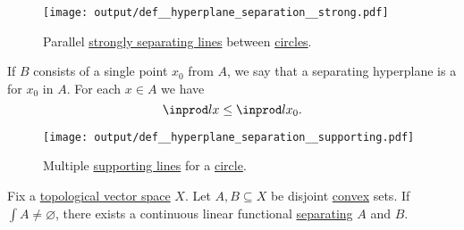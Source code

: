 \begin{definition}
\begin{thmenum}
    \begin{figure}[!ht]
      \centering
      \texttt{[image: output/def\_\_hyperplane\_separation\_\_strong.pdf]}
      \caption{Parallel \hyperref[def:hyperplane_separation/strong]{strongly separating lines} between \hyperref[def:circle]{circles}.}\label{fig:def:hyperplane_separation/strong}
    \end{figure}

     If \( B \) consists of a single point \( x_0 \) from \( A \), we say that a separating hyperplane is a  for \( x_0 \) in \( A \). For each \( x \in A \) we have
    \begin{equation}\label{eq:def:hyperplane_separation/supporting}
      \inprod l x \leq \inprod l {x_0}.
    \end{equation}

    \begin{figure}[!ht]
      \centering
      \texttt{[image: output/def\_\_hyperplane\_separation\_\_supporting.pdf]}
      \caption{Multiple \hyperref[def:hyperplane_separation/supporting]{supporting lines} for a \hyperref[def:circle]{circle}.}\label{fig:def:hyperplane_separation/supporting}
    \end{figure}
  \end{thmenum}
\end{definition}

\begin{theorem}\label{thm:hahn_banach_hyperplane_separation}
  Fix a \hyperref[def:topological_vector_space]{topological vector space} \( X \). Let \( A, B \subseteq X \) be disjoint \hyperref[def:convex_hull]{convex} sets. If \( \int{A} \neq \varnothing \), there exists a continuous linear functional \hyperref[def:hyperplane_separation]{separating} \( A \) and \( B \).
\end{theorem}
